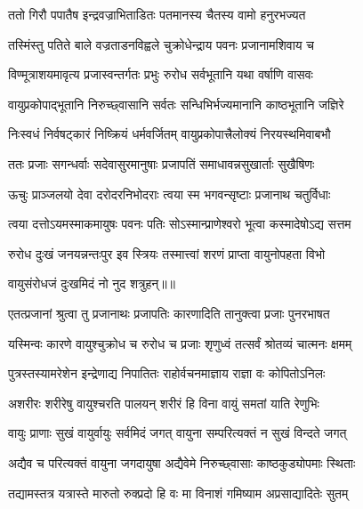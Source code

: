 \twolineshloka
{ततो गिरौ पपातैष इन्द्रवज्राभिताडितः}
{पतमानस्य चैतस्य वामो हनुरभज्यत} %

\twolineshloka
{तस्मिंस्तु पतिते बाले वज्रताडनविह्वले}
{चुक्रोधेन्द्राय पवनः प्रजानामशिवाय च} %

\twolineshloka
{विण्मूत्राशयमावृत्य प्रजास्वन्तर्गतः प्रभुः}
{रुरोध सर्वभूतानि यथा वर्षाणि वासवः} %

\twolineshloka
{वायुप्रकोपाद्भूतानि निरुच्छ्वासानि सर्वतः}
{सन्धिभिर्भज्यमानानि काष्ठभूतानि जज्ञिरे} %

\twolineshloka
{निःस्वधं निर्वषट्कारं निष्क्रियं धर्मवर्जितम्}
{वायुप्रकोपात्त्रैलोक्यं निरयस्थमिवाबभौ} %

\twolineshloka
{ततः प्रजाः सगन्धर्वाः सदेवासुरमानुषाः}
{प्रजापतिं समाधावन्नसुखार्ताः सुखैषिणः} %

\twolineshloka
{ऊचुः प्राञ्जलयो देवा दरोदरनिभोदराः}
{त्वया स्म भगवन्सृष्टाः प्रजानाथ चतुर्विधाः} %

\twolineshloka
{त्वया दत्तोऽयमस्माकमायुषः पवनः पतिः}
{सोऽस्मान्प्राणेश्वरो भूत्वा कस्मादेषोऽद्य सत्तम} %

\twolineshloka
{रुरोध दुःखं जनयन्नन्तःपुर इव स्त्रियः}
{तस्मात्त्वां शरणं प्राप्ता वायुनोपहता विभो} %

{वायुसंरोधजं दुःखमिदं नो नुद शत्रुहन्॥॥} %

\addtocounter{shlokacount}{1}

\twolineshloka
{एतत्प्रजानां श्रुत्वा तु प्रजानाथः प्रजापतिः}
{कारणादिति तानुक्त्वा प्रजाः पुनरभाषत} %

\twolineshloka
{यस्मिन्वः कारणे वायुश्चुक्रोध च रुरोध च}
{प्रजाः शृणुध्वं तत्सर्वं श्रोतव्यं चात्मनः क्षमम्} %

\twolineshloka
{पुत्रस्तस्यामरेशेन इन्द्रेणाद्य निपातितः}
{राहोर्वचनमाज्ञाय राज्ञा वः कोपितोऽनिलः} %

\twolineshloka
{अशरीरः शरीरेषु वायुश्चरति पालयन्}
{शरीरं हि विना वायुं समतां याति रेणुभिः} %

\twolineshloka
{वायुः प्राणाः सुखं वायुर्वायुः सर्वमिदं जगत्}
{वायुना सम्परित्यक्तं न सुखं विन्दते जगत्} %

\twolineshloka
{अद्यैव च परित्यक्तं वायुना जगदायुषा}
{अद्यैवेमे निरुच्छ्वासाः काष्ठकुड्योपमाः स्थिताः} %

\twolineshloka
{तद्यामस्तत्र यत्रास्ते मारुतो रुक्प्रदो हि वः}
{मा विनाशं गमिष्याम अप्रसाद्यादितेः सुतम्} %

